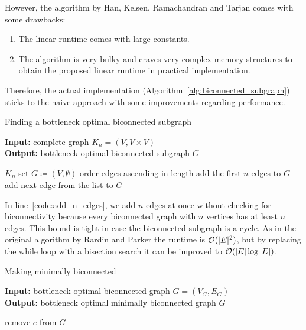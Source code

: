 However, the algorithm by Han, Kelsen, Ramachandran and Tarjan comes with some drawbacks:
\begin{enumerate}
  \item The linear runtime comes with large constants.
  \item The algorithm is very bulky and craves very complex memory structures to obtain the proposed linear runtime in practical implementation.
\end{enumerate}

Therefore, the actual implementation (Algorithm~\ref{alg:biconnected_subgraph}) sticks to the naive approach with some improvements regarding performance.

\begin{algorithm}[ht!]
  \caption{Finding a bottleneck optimal biconnected subgraph}\label{alg:biconnected_subgraph}
  \textbf{Input:} complete graph \(K_n = (V, V \times V)\)\\
  \textbf{Output:} bottleneck optimal biconnected subgraph \(G\)
  \begin{algorithmic}[1]
     {$K_n$}
      \State set \(G \coloneqq (V, \emptyset)\)
      \State order edges ascending in length
      \State add the first \(n\) edges to \(G\)\label{code:add_n_edges}
        \State add next edge from the list to \(G\)
      \EndWhile
      \State{}
    \EndProcedure
  \end{algorithmic}
\end{algorithm}

In line~\ref{code:add_n_edges}, we add \(n\) edges at once without checking for biconnectivity because every biconnected graph with \(n\) vertices has at least \(n\) edges. This bound is tight in case the biconnected subgraph is a cycle. As in the original algorithm by Rardin and Parker the runtime is \(\mathcal{O}(\vert E \vert^2)\), but by replacing the while loop with a bisection search it can be improved to \(\mathcal{O}(\vert E \vert\log \vert E \vert)\).

\begin{algorithm}[ht!]
  \caption{Making minimally biconnected}\label{alg:minimally_biconnected}
  \textbf{Input: } bottleneck optimal biconnected graph \(G = (V_G, E_G)\)\\
  \textbf{Output: } bottleneck optimal minimally biconnected graph \(G\)
  \begin{algorithmic}[1]
          \State remove \(e\) from \(G\)
        \EndIf
      \EndFor
      \State {}
    \EndProcedure
  \end{algorithmic}
\end{algorithm}

